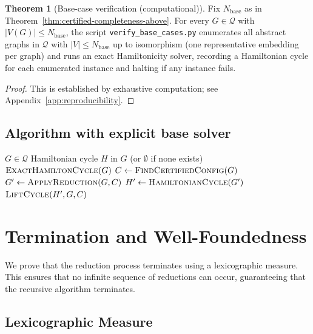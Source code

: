 \documentclass[12pt]{article}
\theoremstyle{definition}
\newtheorem{theorem}{Theorem}
\begin{document}
\begin{theorem}[Base-case verification (computational)]
\label{thm:base-verified}
Fix $N_{\mathrm{base}}$ as in Theorem~\ref{thm:certified-completeness-above}.
For every $G \in \mathcal{Q}$ with $|V(G)| \le N_{\mathrm{base}}$, the script
\texttt{verify\_base\_cases.py} enumerates all abstract graphs in $\mathcal{Q}$ with $|V| \le N_{\mathrm{base}}$ up to isomorphism (one representative embedding per graph) and runs an exact Hamiltonicity solver,
recording a Hamiltonian cycle for each enumerated instance and halting if any instance fails.
\end{theorem}

\begin{proof}
This is established by exhaustive computation; see Appendix~\ref{app:reproducibility}.
\end{proof}

\subsection{Algorithm with explicit base solver}
\label{subsec:algorithm}

\begin{algorithm}[ht]
\caption{Hamiltonian Cycle Finder for $\mathcal Q$}
\label{alg:main}
\begin{algorithmic}[1]
\Require $G \in \mathcal{Q}$
\Ensure Hamiltonian cycle $H$ in $G$ (or $\emptyset$ if none exists)
    \State \Return $\textsc{ExactHamiltonCycle}(G)$
\EndIf
\State $C \gets \textsc{FindCertifiedConfig}(G)$
\State $G' \gets \textsc{ApplyReduction}(G, C)$
\State $H' \gets \textsc{HamiltonianCycle}(G')$
\State \Return $\textsc{LiftCycle}(H', G, C)$
\end{algorithmic}
\end{algorithm}

\section{Termination and Well-Foundedness}
\label{sec:termination}

We prove that the reduction process terminates using a lexicographic measure. This ensures that no infinite sequence of reductions can occur, guaranteeing that the recursive algorithm terminates.

\subsection{Lexicographic Measure}
\end{document}
